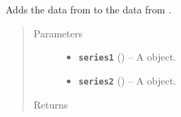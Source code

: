 \documentclass[letterpaper,10pt,openany,oneside]{sphinxmanual}
\begin{document}

\begin{fulllineitems}
\label{additional_functions:fredpy.plus}
Adds the data from  to the data from .
\begin{quote}\begin{description}
\item[{Parameters}] \leavevmode\begin{itemize}
\item {} 
\textbf{\texttt{series1}} ({\hyperref[series_class:fredpy.series]{}}) -- A  object.

\item {} 
\textbf{\texttt{series2}} ({\hyperref[series_class:fredpy.series]{}}) -- A  object.

\end{itemize}

\item[{Returns}] \leavevmode
{\hyperref[series_class:fredpy.series]{}}

\end{description}\end{quote}

\end{fulllineitems}

\end{document}

